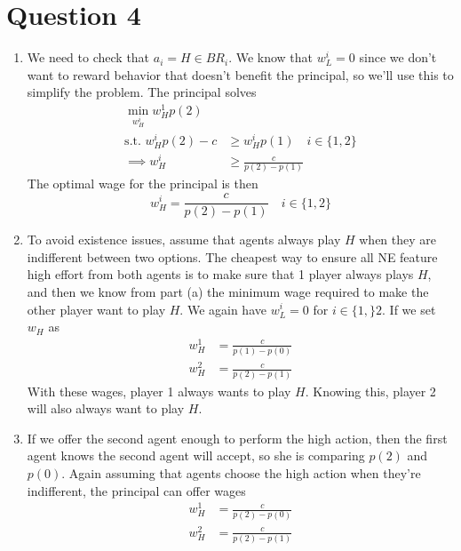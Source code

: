 \section{Question 4}
\begin{enumerate}[label=\alph*)]
\item We need to check that $a_i = H \in BR_i$. We know that $w_L^i = 0$ since we don't want to reward behavior that doesn't benefit the principal, so we'll use this to simplify the problem. The principal solves
  \begin{align*}
    \min_{w_H^i} w_H^1 p(2) \\
    \text{s.t. } w_H^i p(2) - c &\ge w_H^i p(1) \quad i \in \{1, 2\}\\
    \implies w_H^i &\ge \frac{c}{p(2) - p(1)}
  \end{align*}
  The optimal wage for the principal is then
  \[
w_H^i = \frac{c}{p(2) - p(1)} \quad i \in \{1, 2\}
  \]
\item To avoid existence issues, assume that agents always play $H$ when they are indifferent between two options. The cheapest way to ensure all NE feature high effort from both agents is to make sure that 1 player always plays $H$, and then we know from part (a) the minimum wage required to make the other player want to play $H$. We again have $w_L^i = 0$ for $i \in \{1, \}2$. If we set $w_H$ as
  \begin{align*}
    w_H^1 &= \frac{c}{p(1) - p(0)}\\
    w_H^2 &= \frac{c}{p(2) - p(1)}
  \end{align*}
  With these wages, player 1 always wants to play $H$. Knowing this, player 2 will also always want to play $H$.
\item
  If we offer the second agent enough to perform the high action, then the first agent knows the second agent will accept, so she is comparing $p(2)$ and $p(0)$. Again assuming that agents choose the high action when they're indifferent, the principal can offer wages
  \begin{align*}
    w_H^1 &= \frac{c}{p(2) - p(0)}\\
    w_H^2 &= \frac{c}{p(2) - p(1)}
  \end{align*}
\end{enumerate}

